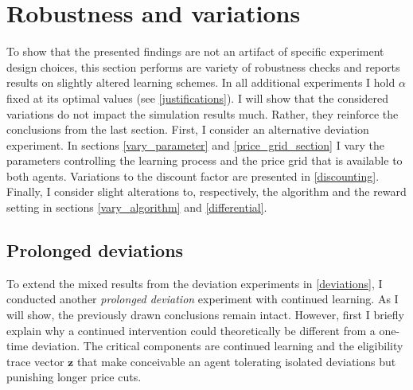 \section{Robustness and variations}\label{robustness}

To show that the presented findings are not an artifact of specific experiment design choices, this section performs are variety of robustness checks and reports results on slightly altered learning schemes. In all additional experiments I hold $\alpha$ fixed at its optimal values (see \autoref{justifications}). I will show that the considered variations do not impact the simulation results much. Rather, they reinforce the conclusions from the last section. First, I consider an alternative deviation experiment. In sections \ref{vary_parameter} and \ref{price_grid_section} I vary the parameters controlling the learning process and the price grid that is available to both agents. Variations to the discount factor are presented in \autoref{discounting}. Finally, I consider slight alterations to, respectively, the algorithm and the reward setting in sections \ref{vary_algorithm} and \ref{differential}.

\subsection{Prolonged deviations}\label{prolonged_deviations}

To extend the mixed results from the deviation experiments in \autoref{deviations}, I conducted another \emph{prolonged deviation} experiment with continued learning. As I will show, the previously drawn conclusions remain intact. However, first I briefly explain why a continued intervention could theoretically be different from a one-time deviation. The critical components are continued learning and the eligibility trace vector $\boldsymbol{z}$ that make conceivable an agent tolerating isolated deviations but punishing longer price cuts.

